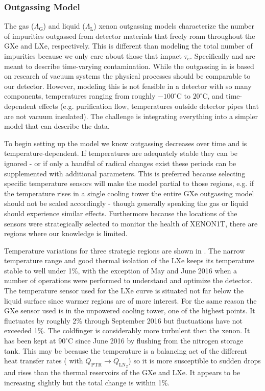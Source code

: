 \subsubsection{Outgassing Model}
\label{subsubsec:electron_lifetime_model_outgassing_model}
The gas ($\Lambda_{\mathrm{G}}$) and liquid ($\Lambda_{\mathrm{L}}$) xenon outgassing models characterize the number of impurities outgassed from detector
materials that freely roam throughout
the GXe and LXe, respectively.  This is different than modeling the total number of impurities because we only care about those
that impact $\tau_e$.  Specifically \outg and \outl are meant to describe time-varying contamination.  While the outgassing in
 is based on research of vacuum systems the physical processes should be
comparable to our detector.  However, modeling this is not feasible in a detector with so
many components, temperatures ranging from roughly $-100^{\circ} \mathrm{C}$ to $20^{\circ} \mathrm{C}$, and time-dependent effects (e.g.
purification flow, temperatures outside detector pipes that are not vacuum insulated).  The challenge is integrating everything into
a simpler model that can describe the data.

To begin setting up the model we know outgassing decreases over time and is temperature-dependent.  If temperatures
are adequately stable they can be ignored - or if only a handful of radical changes exist these periods can be supplemented with
additional parameters.  This is preferred because selecting specific temperature sensors will make the model
partial to those regions, e.g. if the temperature rises in a single cooling tower the entire GXe outgassing model should not be scaled
accordingly - though generally speaking the gas or liquid should experience similar effects.  Furthermore because the locations of the
sensors were strategically selected to monitor the health of XENON1T, there are regions where our knowledge is limited.

Temperature variations for three strategic regions are shown in .  The
narrow temperature range and good thermal isolation of the LXe keeps its temperature stable to well under 1\%, with the exception of May
and June 2016 when a number of operations were performed to understand and optimize the detector.  The temperature sensor used for the
LXe curve is situated not far below the liquid surface since warmer regions are of more interest.  For the same reason the GXe sensor used
is in the unpowered cooling tower, one of the highest points.  It fluctuates by roughly 2\% through September 2016 but fluctuations have
not exceeded 1\%.  The  coldfinger is considerably more turbulent then the xenon.  It has been kept at $90^{\circ}\mathrm{C}$
since June 2016 by flushing  from the nitrogen storage tank.  This may be because the temperature is a balancing act of the
different heat transfer rates ( with
$\dot{Q}_{\mathrm{PTR}} \rightarrow \dot{Q}_{\mathrm{LN_2}}$) so it is more susceptible to sudden drops and
rises than the thermal reservoirs of the GXe and LXe.  It appears to be increasing slightly but the total change is within 1\%.


